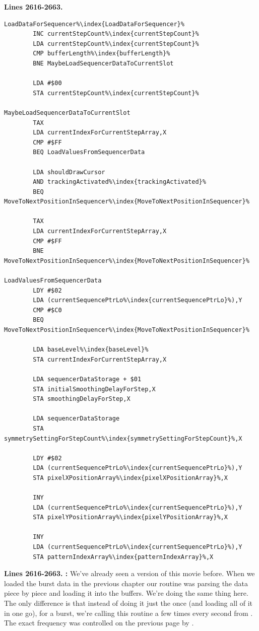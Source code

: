 \clearpage
\textbf{Lines 2616-2663. }
\begin{lstlisting}[escapechar=\%]
LoadDataForSequencer%\index{LoadDataForSequencer}%   
        INC currentStepCount%\index{currentStepCount}%
        LDA currentStepCount%\index{currentStepCount}%
        CMP bufferLength%\index{bufferLength}%
        BNE MaybeLoadSequencerDataToCurrentSlot

        LDA #$00
        STA currentStepCount%\index{currentStepCount}%

MaybeLoadSequencerDataToCurrentSlot   
        TAX 
        LDA currentIndexForCurrentStepArray,X
        CMP #$FF
        BEQ LoadValuesFromSequencerData

        LDA shouldDrawCursor
        AND trackingActivated%\index{trackingActivated}%
        BEQ MoveToNextPositionInSequencer%\index{MoveToNextPositionInSequencer}%

        TAX 
        LDA currentIndexForCurrentStepArray,X
        CMP #$FF
        BNE MoveToNextPositionInSequencer%\index{MoveToNextPositionInSequencer}%

LoadValuesFromSequencerData   
        LDY #$02
        LDA (currentSequencePtrLo%\index{currentSequencePtrLo}%),Y
        CMP #$C0
        BEQ MoveToNextPositionInSequencer%\index{MoveToNextPositionInSequencer}%

        LDA baseLevel%\index{baseLevel}%
        STA currentIndexForCurrentStepArray,X

        LDA sequencerDataStorage + $01
        STA initialSmoothingDelayForStep,X
        STA smoothingDelayForStep,X

        LDA sequencerDataStorage
        STA symmetrySettingForStepCount%\index{symmetrySettingForStepCount}%,X

        LDY #$02
        LDA (currentSequencePtrLo%\index{currentSequencePtrLo}%),Y
        STA pixelXPositionArray%\index{pixelXPositionArray}%,X

        INY 
        LDA (currentSequencePtrLo%\index{currentSequencePtrLo}%),Y
        STA pixelYPositionArray%\index{pixelYPositionArray}%,X

        INY 
        LDA (currentSequencePtrLo%\index{currentSequencePtrLo}%),Y
        STA patternIndexArray%\index{patternIndexArray}%,X

\end{lstlisting}

\clearpage

\textbf{Lines 2616-2663. :} We've already seen a version of this movie before. When we loaded the burst data in the previous chapter
our routine was parsing the data piece by piece and loading it into the buffers. We're doing the same thing here. The only difference is that instead of doing it just
the once (and loading all of it in one go), for a burst, we're calling this routine a few times every second from . The exact frequency was controlled on the previous page
by . 

